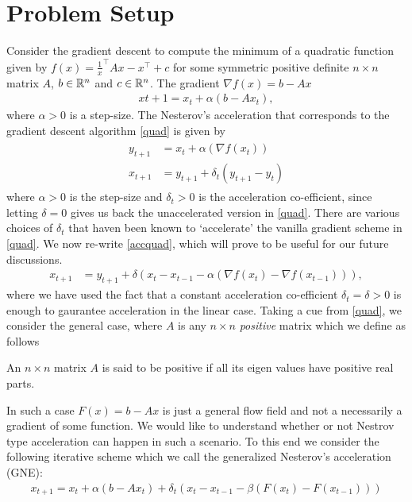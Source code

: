 \section{Problem Setup}
Consider the gradient descent to compute the minimum of a quadratic function given by $f(x)=\frac{1}x^\top A x-x^\top +c$ for some symmetric positive definite $n\times n$ matrix $A$, $b\in \mathbb{R}^n$ and $c\in\mathbb{R}^n$. The gradient $\nabla f(x)=b-Ax$
\begin{align}\label{quad}
x{t+1}=x_t+\alpha (b-Ax_t),
\end{align}
where $\alpha>0$ is a step-size. The Nesterov's acceleration that corresponds to the gradient descent algorithm \eqref{quad} is given by
\begin{align}\label{accquad}
\begin{split}
y_{t+1}&=x_t+\alpha(\nabla f(x_t))\\
x_{t+1}&=y_{t+1}+\delta_t(y_{t+1}-y_{t})
\end{split}
\end{align}
where $\alpha>0$ is the step-size and $\delta_t>0$ is the acceleration co-efficient, since letting $\delta=0$ gives us back the unaccelerated version in \eqref{quad}. There are various choices of $\delta_t$ that haven been known to `accelerate' the vanilla gradient scheme in \eqref{quad}. We now re-write \eqref{accquad}, which will prove to be useful for our future discussions.
\begin{align}\label{accquadrw}
x_{t+1}&=y_{t+1}+\delta(x_{t}-x_{t-1}-\alpha(\nabla f(x_t)-\nabla f(x_{t-1}))),
\end{align}
where we have used the fact that a constant acceleration co-efficient $\delta_t=\delta>0$ is enough to gaurantee acceleration in the linear case.
Taking a cue from \eqref{quad}, we consider the general case, where $A$ is any $n\times n$ \emph{positive} matrix which we define as follows
\begin{definition}\label{pos}
An $n\times n$ matrix $A$ is said to be positive if all its eigen values have positive real parts.
\end{definition}
In such a case $F(x)=b-Ax$ is just a general flow field and not a necessarily a gradient of some function. We would like to understand whether or not Nestrov type acceleration can happen in such a scenario. To this end we consider the following iterative scheme which we call the generalized Nesterov's acceleration (GNE):
\begin{align}\label{accgen}
x_{t+1}=x_t+\alpha(b-Ax_t)+\delta_t (x_t-x_{t-1}-\beta(F(x_t)-F(x_{t-1})) )
\end{align}
